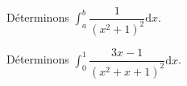 \documentclass[french,11pt,twoside]{VcCours}
\newcommand{\dx}{\text{d}x}
\newcommand{\Int}[2]{\int_{#1}^{#2}}
\begin{document}
\begin{Exemple} Déterminons $\Int{a}{b} \dfrac{1}{(x^2+1)^2} \dx$.
%

\vspace{7cm}

\end{Exemple}

\newpage
\begin{Exemple} Déterminons $\Int{0}{1} \dfrac{3x-1}{(x^2+x+1)^2} \dx$.
%

\vspace*{10cm}
\end{Exemple}

\end{document}
